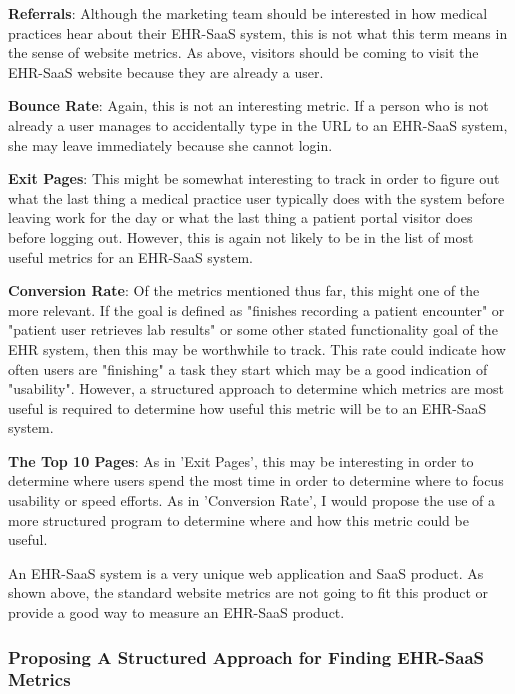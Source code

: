 \documentclass[10pt]{article}
\begin{document}
\textbf{Referrals}: Although the marketing team should be interested in how medical practices hear about their EHR-SaaS system, this is not what this term means in the sense of website metrics.
As above, visitors should be coming to visit the EHR-SaaS website because they are already a user.

\textbf{Bounce Rate}: Again, this is not an interesting metric. If a person who is not already a user manages to accidentally type in the URL to an EHR-SaaS system, she may leave immediately because she cannot login.

\textbf{Exit Pages}: This might be somewhat interesting to track in order to figure out what the last thing a medical practice user typically does with the system before leaving work for the day or what the last thing a patient portal visitor does before logging out.
However, this is again not likely to be in the list of most useful metrics for an EHR-SaaS system.

\textbf{Conversion Rate}: Of the metrics mentioned thus far, this might one of the more relevant.
If the goal is defined as "finishes recording a patient encounter" or "patient user retrieves lab results" or some other stated functionality goal of the EHR system, then this may be worthwhile to track.
This rate could indicate how often users are "finishing" a task they start which may be a good indication of "usability".
However, a structured approach to determine which metrics are most useful is required to determine how useful this metric will be to an EHR-SaaS system.

\textbf{The Top 10 Pages}: As in 'Exit Pages', this may be interesting in order to determine where users spend the most time in order to determine where to focus usability or speed efforts.
As in 'Conversion Rate', I would propose the use of a more structured program to determine where and how this metric could be useful.

An EHR-SaaS system is a very unique web application and SaaS product.
As shown above, the standard website metrics are not going to fit this product or provide a good way to measure an EHR-SaaS product.

\subsubsection{Proposing A Structured Approach for Finding EHR-SaaS Metrics}
\label{sec:EHR-SaaS-GQM-Intro}
\end{document}
